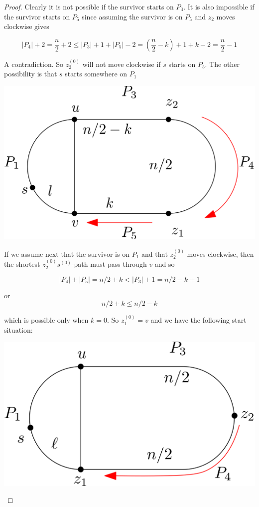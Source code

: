 \documentclass[letterpaper, 10pt]{article}
\begin{document}
\begin{proof}
Clearly it is not possible if the survivor starts on $P_3$.
It is also impossible if the survivor starts on $P_5$ since assuming the survivor
is on $P_5$ and $z_2$ moves clockwise gives

\[ |P_4| + 2 = \frac{n}{2} +2 \leq |P_3| + 1 + |P_5| -2 = \left(\frac{n}{2} - k\right) + 1 + k-2 = \frac{n}{2} -1 \]

A contradiction.
So $z_2^{(0)}$ will not move clockwise if $s$ starts on $P_5$. The other
possibility is that $s$ starts somewhere on $P_1$

\begin{center}
\includegraphics[scale=0.15]{diagramCaseI_3}
\end{center}

If we assume next that the survivor is on $P_1$ and that $z_2^{(0)}$ moves clockwise, then the shortest
$z_2^{(0)}s^{(0)}$-path must pass through $v$ and so

\[ |P_4| + |P_5| = n/2 + k < |P_3| + 1 = n/2 -k +1 \]

or
\[ n/2 +k \leq n/2 -k \]

which is possible only when $k=0$. So $z_1^{(0)} = v$ and we have the following
start situation:

\begin{center}
\includegraphics[scale=0.15]{diagramCaseI_4}
\end{center}


\end{proof}
\end{document}
